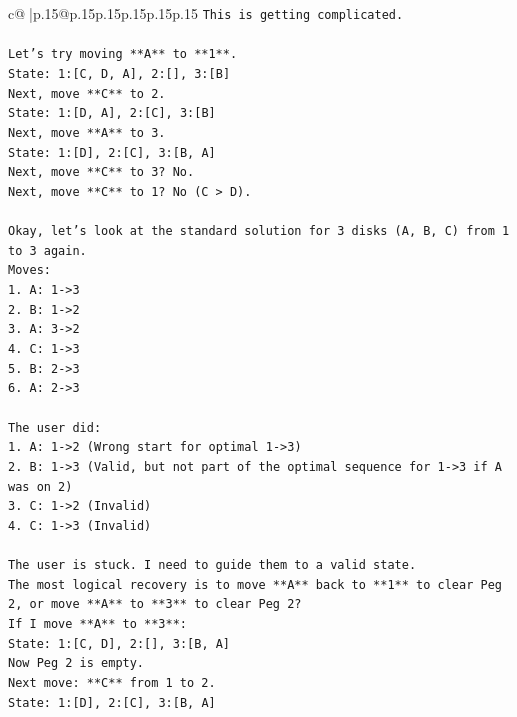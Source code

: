 \documentclass{article}
\begin{document}
{\begin{supertabular}{c@{$\;$}|p{.15\linewidth}@{}p{.15\linewidth}p{.15\linewidth}p{.15\linewidth}p{.15\linewidth}p{.15\linewidth}}
{{{\texttt{This is getting complicated.} \\
\\ 
\texttt{Let's try moving **A** to **1**.} \\
\texttt{State: 1:{[}C, D, A{]}, 2:{[}{]}, 3:{[}B{]}} \\
\texttt{Next, move **C** to 2.} \\
\texttt{State: 1:{[}D, A{]}, 2:{[}C{]}, 3:{[}B{]}} \\
\texttt{Next, move **A** to 3.} \\
\texttt{State: 1:{[}D{]}, 2:{[}C{]}, 3:{[}B, A{]}} \\
\texttt{Next, move **C** to 3? No.} \\
\texttt{Next, move **C** to 1? No (C > D).} \\
\\ 
\texttt{Okay, let's look at the standard solution for 3 disks (A, B, C) from 1 to 3 again.} \\
\texttt{Moves:} \\
\texttt{1. A: 1{-}>3} \\
\texttt{2. B: 1{-}>2} \\
\texttt{3. A: 3{-}>2} \\
\texttt{4. C: 1{-}>3} \\
\texttt{5. B: 2{-}>3} \\
\texttt{6. A: 2{-}>3} \\
\\ 
\texttt{The user did:} \\
\texttt{1. A: 1{-}>2 (Wrong start for optimal 1{-}>3)} \\
\texttt{2. B: 1{-}>3 (Valid, but not part of the optimal sequence for 1{-}>3 if A was on 2)} \\
\texttt{3. C: 1{-}>2 (Invalid)} \\
\texttt{4. C: 1{-}>3 (Invalid)} \\
\\ 
\texttt{The user is stuck. I need to guide them to a valid state.} \\
\texttt{The most logical recovery is to move **A** back to **1** to clear Peg 2, or move **A** to **3** to clear Peg 2?} \\
\texttt{If I move **A** to **3**:} \\
\texttt{State: 1:{[}C, D{]}, 2:{[}{]}, 3:{[}B, A{]}} \\
\texttt{Now Peg 2 is empty.} \\
\texttt{Next move: **C** from 1 to 2.} \\
\texttt{State: 1:{[}D{]}, 2:{[}C{]}, 3:{[}B, A{]}} \\
}}}
\end{supertabular}}
\end{document}
